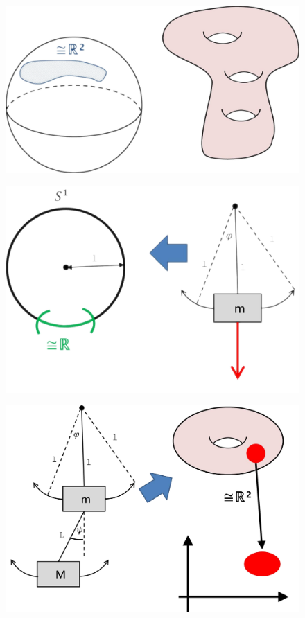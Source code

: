 \documentclass[a4paper,11pt,notitlepage]{report}
\theoremstyle{definition}
\begin{document}
\begin{figure}[h]

\begin{minipage}[b]{7cm}{\includegraphics[scale=0.3]{images/Mannigfaltigkeiten1.png}}\end{minipage}
\begin{minipage}[b]{7cm}{\includegraphics[scale=0.4]{images/S1_Pendel.png}}\end{minipage}
\newline
\begin{minipage}[b]{10cm}{\includegraphics[scale=0.4]{images/Torus_Doppelpendel.png}}\end{minipage}

\end{figure}
\end{document}
